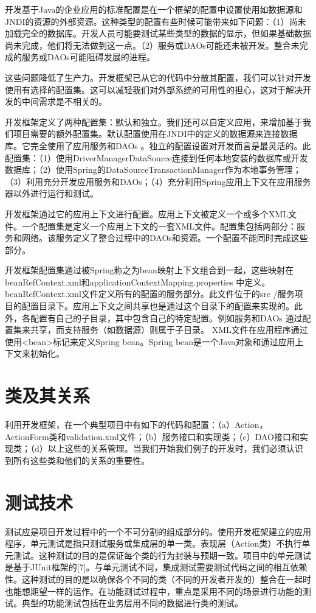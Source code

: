 开发基于Java的企业应用的标准配置是在一个框架的配置中设置使用如数据源和JNDI的资源的外部资源。这种类型的配置有些时候可能带来如下问题：（1）尚未加载完全的数据库。开发人员可能要测试某些类型的数据的显示，但如果基础数据尚未完成，他们将无法做到这一点。（2）服务或DAOs可能还未被开发。整合未完成的服务或DAOs可能阻碍发展的进程。

这些问题降低了生产力。开发框架已从它的代码中分散其配置，我们可以针对开发使用有选择的配置集。这可以减轻我们对外部系统的可用性的担心，这对于解决开发的中间需求是不相关的。

开发框架定义了两种配置集：默认和独立。我们还可以自定义应用，来增加基于我们项目需要的额外配置集。默认配置使用在JNDI中的定义的数据源来连接数据库。它完全使用了应用服务和DAOs 。独立的配置设置对开发而言是最灵活的。此配置集：（1）使用DriverManagerDataSource连接到任何本地安装的数据库或开发数据库；（2）使用Spring的DataSourceTransactionManager作为本地事务管理；（3）利用充分开发应用服务和DAOs；（4）充分利用Spring应用上下文在应用服务器以外进行运行和测试。

开发框架通过它的应用上下文进行配置。应用上下文被定义一个或多个XML文件。一个配置集是定义一个应用上下文的一套XML文件。配置集包括两部分：服务和网络。该服务定义了整合过程中的DAOs和资源。一个配置不能同时完成这些部分。

开发框架配置集通过被Spring称之为bean映射上下文组合到一起，这些映射在beanRefContext.xml和applicationContextMapping.properties 中定义。beanRefContext.xml文件定义所有的配置的服务部分。此文件位于的src /服务项目的配置目录下。应用上下文之间共享也是通过这个目录下的配置来实现的。此外，各配置有自己的子目录，其中包含自己的特定配置。例如服务和DAOs 通过配置集来共享，而支持服务（如数据源）则属于子目录。 XML文件在应用程序通过使用<bean>标记来定义Spring bean。Spring bean是一个Java对象和通过应用上下文来初始化。

\section{类及其关系}
利用开发框架，在一个典型项目中有如下的代码和配置：（a）Action，ActionForm类和validation.xml文件；（b）服务接口和实现类；（c）DAO接口和实现类；（d）以上这些的关系管理。当我们开始我们例子的开发时，我们必须认识到所有这些类和他们的关系的重要性。

\section{测试技术}
测试应是项目开发过程中的一个不可分割的组成部分的。使用开发框架建立的应用程序，单元测试是指只测试服务或集成层的单一类。表现层（Action类）不执行单元测试。这种测试的目的是保证每个类的行为封装与预期一致。项目中的单元测试是基于JUnit框架的[7]。与单元测试不同，集成测试需要测试代码之间的相互依赖性。这种测试的目的是以确保各个不同的类（不同的开发者开发的）整合在一起时也能想期望一样的运作。在功能测试过程中，重点是采用不同的场景进行功能的测试。典型的功能测试包括在业务层用不同的数据进行类的测试。

